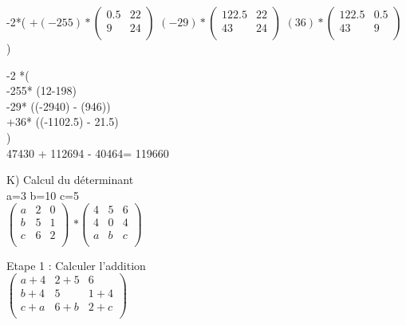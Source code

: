 \vspace{5mm} %

-2*(
$
+(-255)*
\begin{pmatrix}
  0.5 & 22 \\
  9   & 24 \\
\end{pmatrix}
$
$
(-29)*
\begin{pmatrix}
  122.5 & 22 \\
  43   & 24 \\
\end{pmatrix}
$
$
(36)*
\begin{pmatrix}
  122.5 & 0.5 \\
  43   & 9 \\
\end{pmatrix}
$
)

\vspace{3mm}

-2 *( \\
-255* (12-198)\\
-29* ((-2940) - (946)) \\
+36* ((-1102.5) - 21.5) \\
) \\

47430 + 112694 - 40464= 119660


\newpage

K) Calcul du déterminant \\

a=3 b=10 c=5 \\

$
\begin{pmatrix}
  a & 2 & 0 \\
  b & 5 & 1 \\
  c & 6 & 2 \\
\end{pmatrix}
$
\vspace{5mm} %
$
*
\begin{pmatrix}
  4 & 5 & 6 \\
  4 & 0 & 4 \\
  a & b & c \\
\end{pmatrix}
$
\vspace{5mm} %

Etape 1 :  Calculer l'addition \\

\vspace{3mm} %
$
\begin{pmatrix}
  a+4 & 2+5  & 6  \\
  b+4 & 5    & 1+4 \\
  c+a & 6+b  & 2+c \\
\end{pmatrix}
$

